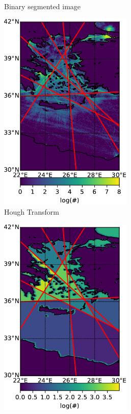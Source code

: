 \documentclass{article}
\begin{document}
\begin{figure}[h]
\begin{subfigure}[b]{0.49\linewidth}
    \caption{Binary segmented image} 
    \label{fig7:b} 
    \vspace{13ex}
    \end{subfigure} 
  \begin{subfigure}[b]{0.49\linewidth}
    \centering
    \includegraphics[width=0.7\textwidth]{AGEAN_DCRON_lines-crop.pdf} 
    \caption{Hough Transform} 
    \label{fig7:c} 
  \end{subfigure}%
  \begin{subfigure}[b]{0.49\linewidth}
    \centering
    \includegraphics[width=0.7\textwidth]{AGEAN_DCRON_segmented-crop.pdf} 

\end{subfigure}
\end{figure}
\end{document}
